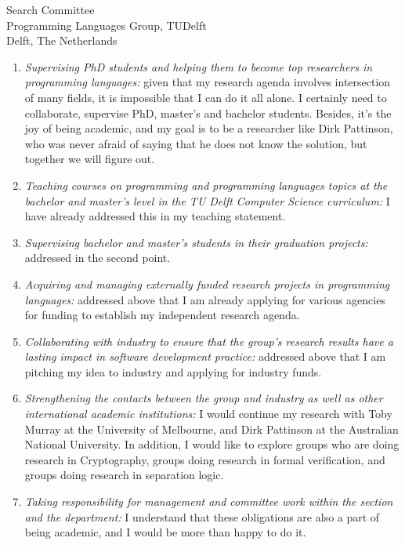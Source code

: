 \documentclass{letter}
\begin{document}
\begin{letter}{Search Committee\\
Programming Languages Group, TUDelft\\
Delft, The Netherlands}
\begin{enumerate}
\item \textit{Supervising PhD students and helping them to become top researchers in programming languages:} 
 given that my research agenda involves intersection of many fields, it is impossible that I can do it all alone. I certainly 
 need to collaborate, supervise PhD, master's and bachelor students. Besides, it's the joy of being academic, 
 and my goal is to be a researcher like Dirk Pattinson, who was never afraid of 
  saying that he does not know the solution, but together we will figure out.   
  
\item \textit{Teaching courses on programming and programming languages topics at the bachelor and master’s level in the TU Delft Computer Science curriculum:}
  I have already addressed this in my teaching statement.   	
  
\item \textit{Supervising bachelor and master’s students in their graduation projects:} 
 addressed in the second point. 
  
\item \textit{Acquiring and managing externally funded research projects in programming languages:}
 addressed above that I am already applying for various agencies for funding to establish my independent 
 research agenda. 

\item \textit{Collaborating with industry to ensure that the group’s research results have a lasting impact in software development practice:}
   addressed above that I am pitching my idea to industry and applying for industry funds. 
   
\item \textit{Strengthening the contacts between the group and industry as well as other international academic institutions:} 
  I would continue my research with Toby Murray at the University of Melbourne, and Dirk Pattinson at the Australian 
  National University. In addition, I would like to explore groups who are doing research in Cryptography, 
  groups doing research in formal verification, and groups doing research in separation logic. 
  
\item \textit{Taking responsibility for management and committee work within the section and the department:} 
  I understand that these obligations are also a part of being academic, and I would be more than happy to do it.
  	
\end{enumerate} 



\end{letter}
\end{document}
